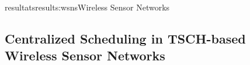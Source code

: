 \documentclass{ra2016}
\begin{document}
\begin{module}{resultats}{results:wsns}{Wireless Sensor Networks}
%
%

\subsection{Centralized Scheduling in TSCH-based Wireless Sensor Networks}


\end{module}
\end{document}
